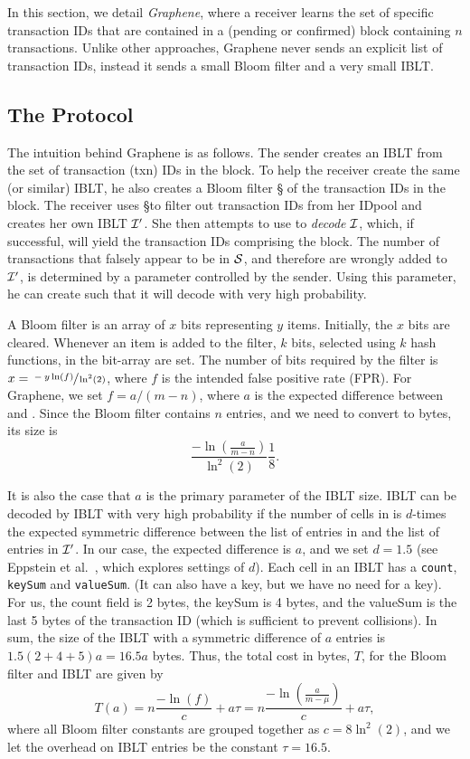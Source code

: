 In this section, we detail \emph{Graphene},
where a receiver 
learns the set of specific transaction IDs that are contained in a
(pending or confirmed) block containing $n$ transactions. Unlike other approaches, Graphene never  sends an explicit list of transaction IDs, instead it sends  a small Bloom filter and a very small IBLT.  



\subsection{The Protocol}
The intuition behind Graphene is as follows. The sender creates an IBLT \I
from the set of transaction (txn) IDs in the block. To help the receiver
create the same (or similar) IBLT, he also creates a Bloom filter \S
 of the transaction IDs in the block. The receiver uses \S to filter out
transaction IDs from her IDpool %
and creates her own IBLT $\cal{I}'$. She then attempts to use \Ip to \emph{decode} $\cal{I}$, which, if successful, will yield
the transaction IDs comprising the block. The number of transactions
that falsely appear to be in $\cal{S}$, and therefore are wrongly added to
$\cal{I}'$, is determined by a parameter controlled by the sender. Using
this parameter, he can
create \I such that it will decode with very high probability.  

A Bloom filter is an array of $x$ bits
representing $y$ items.  Initially, the $x$ bits are cleared. Whenever
an item is added to the filter, $k$ bits, selected using $k$ hash functions, in the bit-array are set. The number of bits
required by the filter is $x =\sfrac{-y\ln(f)}{\ln^2(2)}$, where $f$ is
the intended false positive rate (FPR).  For Graphene, we set $f=a/(m-n)$,
where $a$ is the expected difference between \I and \Ip .
Since the Bloom filter contains $n$ entries, and we need to convert to
bytes, its size is 
$$\frac{-\ln(\frac{a}{m-n})}{\ln^2(2)}\frac18. $$

It is also the case that $a$ is the primary parameter of the IBLT
size.  IBLT \I can be decoded by IBLT \Ip with very high probability
if the number of cells in \I is $d$-times the expected symmetric
difference between the list of entries in \I and the list of entries
in $\cal{I}'$. In our case, the expected difference is $a$, and we set
$d=1.5$ (see Eppstein et al.~\cite{eppstein:2011}, which explores
settings of $d$). Each cell in an IBLT has a {\tt count}, {\tt keySum} and
{\tt valueSum}.
(It can also have a key, but we have
no need for a key). For us, the count field is 2 bytes, the
keySum is 4 bytes, and the valueSum is the last 5 bytes of the
transaction ID (which is sufficient to prevent collisions). In sum,
the size of the IBLT with a symmetric difference of $a$ entries is
$1.5(2+4+5)a=16.5a$ bytes.
Thus, the total cost in bytes, $T$, for the Bloom filter and IBLT are
given by 
$$T(a)= n\frac{-\ln(f)}{c}+ a\tau = n\frac{-\ln(\frac{a}{m-\mu})}{c}+ a\tau,$$ 
where all Bloom filter constants are grouped together as
$c=8\ln^2(2)$, and we let the overhead on IBLT entries be the constant
$\tau=16.5$.

